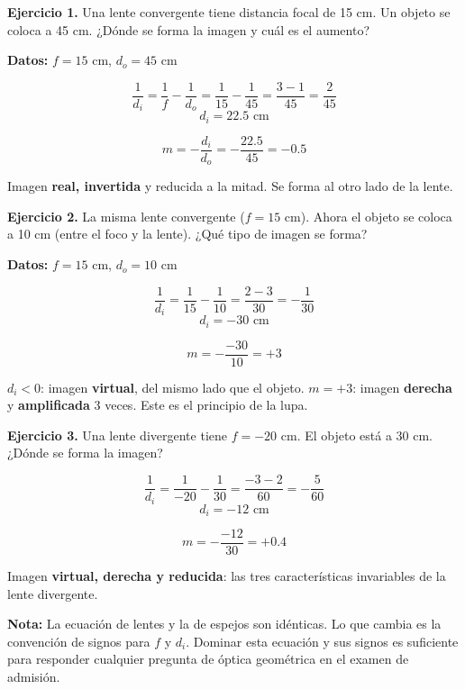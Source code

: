 \begin{seccion}

\textbf{Ejercicio 1.} Una lente convergente tiene distancia focal de 15 cm. Un objeto se coloca a 45 cm. ¿Dónde se forma la imagen y cuál es el aumento?

\begin{ecuacion}
\textbf{Datos:} $f = 15$ cm, $d_o = 45$ cm

$$\frac{1}{d_i} = \frac{1}{f} - \frac{1}{d_o} = \frac{1}{15} - \frac{1}{45} = \frac{3-1}{45} = \frac{2}{45}$$
$$d_i = 22.5 \text{ cm}$$

$$m = -\frac{d_i}{d_o} = -\frac{22.5}{45} = -0.5$$

Imagen \textbf{real, invertida} y reducida a la mitad. Se forma al otro lado de la lente.
\end{ecuacion}

\vspace{0.4cm}

\textbf{Ejercicio 2.} La misma lente convergente ($f = 15$ cm). Ahora el objeto se coloca a 10 cm (entre el foco y la lente). ¿Qué tipo de imagen se forma?

\begin{ecuacion}
\textbf{Datos:} $f = 15$ cm, $d_o = 10$ cm

$$\frac{1}{d_i} = \frac{1}{15} - \frac{1}{10} = \frac{2-3}{30} = -\frac{1}{30}$$
$$d_i = -30 \text{ cm}$$

$$m = -\frac{-30}{10} = +3$$

$d_i < 0$: imagen \textbf{virtual}, del mismo lado que el objeto. $m = +3$: imagen \textbf{derecha} y \textbf{amplificada} 3 veces. Este es el principio de la lupa.
\end{ecuacion}

\vspace{0.4cm}

\textbf{Ejercicio 3.} Una lente divergente tiene $f = -20$ cm. El objeto está a 30 cm. ¿Dónde se forma la imagen?

\begin{ecuacion}
$$\frac{1}{d_i} = \frac{1}{-20} - \frac{1}{30} = \frac{-3-2}{60} = -\frac{5}{60}$$
$$d_i = -12 \text{ cm}$$

$$m = -\frac{-12}{30} = +0.4$$

Imagen \textbf{virtual, derecha y reducida}: las tres características invariables de la lente divergente.
\end{ecuacion}

\begin{nota}
\textbf{Nota:} La ecuación de lentes y la de espejos son idénticas. Lo que cambia es la convención de signos para $f$ y $d_i$. Dominar esta ecuación y sus signos es suficiente para responder cualquier pregunta de óptica geométrica en el examen de admisión.
\end{nota}

\end{seccion}

